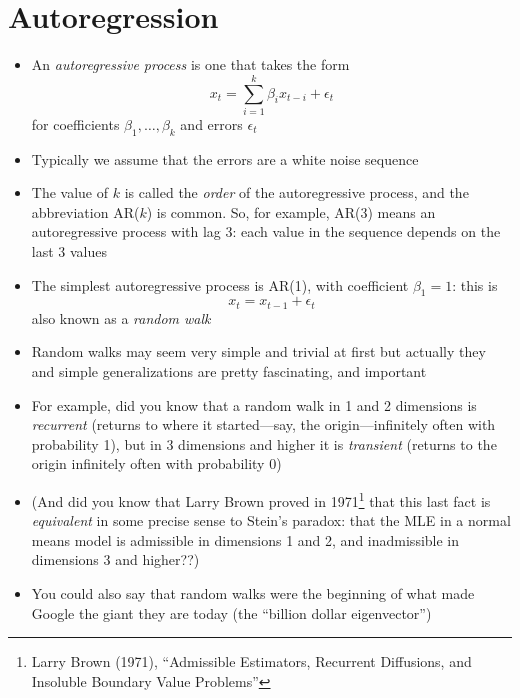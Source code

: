 \documentclass{article}
\begin{document}
\section{Autoregression}

\begin{itemize}
\item An \emph{autoregressive process} is one that takes the form  
  \[
  x_t = \sum_{i=1}^k \beta_i x_{t-i} + \epsilon_t
  \]
  for coefficients $\beta_1,\dots,\beta_k$ and errors $\epsilon_t$

\item Typically we assume that the errors are a white noise sequence

\item The value of $k$ is called the \emph{order} of the autoregressive process,
  and the abbreviation AR($k$) is common. So, for example, AR(3) means an
  autoregressive process with lag 3: each value in the sequence depends on the  
  last 3 values

\item The simplest autoregressive process is AR(1), with coefficient $\beta_1 =
  1$: this is  
  \[
  x_t = x_{t-1} + \epsilon_t
  \]
  also known as a \emph{random walk}

\item Random walks may seem very simple and trivial at first but actually they
  and simple generalizations are pretty fascinating, and important

\item For example, did you know that a random walk in 1 and 2 dimensions is 
  \emph{recurrent} (returns to where it started---say, the origin---infinitely
  often with probability 1), but in 3 dimensions and higher it is
  \emph{transient} (returns to the origin infinitely often with probability 0) 

\item (And did you know that Larry Brown proved in 1971\footnote{Larry Brown
    (1971), ``Admissible Estimators, Recurrent Diffusions, and Insoluble
    Boundary Value Problems''} 
  that this last fact is \emph{equivalent} in some precise sense to Stein's
  paradox: that the MLE in a normal means model is admissible in dimensions 1
  and 2, and inadmissible in dimensions 3 and higher??)    

\item You could also say that random walks were the beginning of what made
  Google the giant they are today (the ``billion dollar eigenvector'')


\end{itemize}
\end{document}
